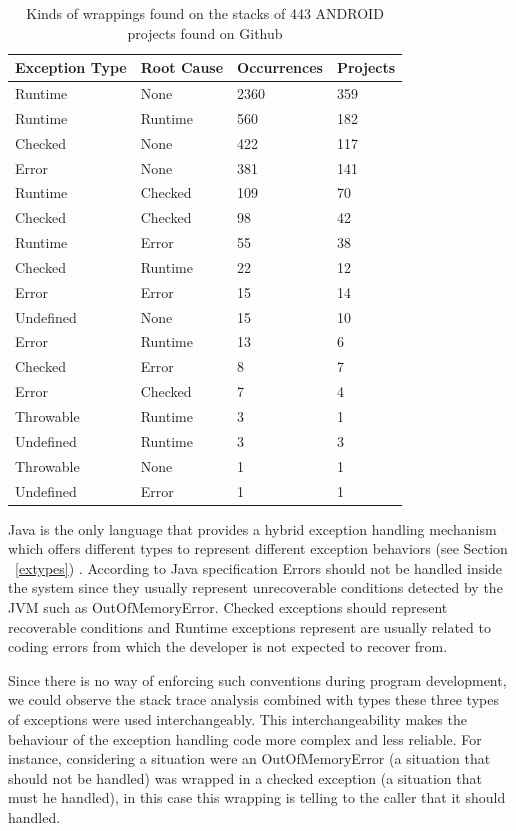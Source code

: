 \documentclass[conference]{IEEEtran}
\begin{document}
\begin{table}
\centering
\begin{tabular}{llll}
    \hline
    \bfseries{Exception Type} & \bfseries{Root Cause} & \bfseries{Occurrences} & \bfseries{Projects} \\
    \hline
    Runtime	&	None	&	2360	&	359	\\
Runtime	&	Runtime	&	560	&	182	\\
Checked	&	None	&	422	&	117	\\
Error	&	None	&	381	&	141	\\
Runtime	&	Checked	&	109	&	70	\\
Checked	&	Checked	&	98	&	42	\\
Runtime	&	Error	&	55	&	38	\\
Checked	&	Runtime	&	22	&	12	\\
Error	&	Error	&	15	&	14	\\
Undefined	&	None	&	15	&	10	\\
Error	&	Runtime	&	13	&	6	\\
Checked	&	Error	&	8	&	7	\\
Error	&	Checked	&	7	&	4	\\
Throwable	&	Runtime	&	3	&	1	\\
Undefined	&	Runtime	&	3	&	3	\\
Throwable	&	None	&	1	&	1	\\
Undefined	&	Error	&	1	&	1	\\
    \hline
  \end{tabular}
\caption{Kinds of wrappings found on the stacks of 443 ANDROID projects found on Github}
\label{fig:wrappingandroid}
\end{table}

Java is the only language that provides a hybrid exception handling mechanism which offers different types to represent different exception behaviors (see Section ~\ref{extypes}) . According to Java specification Errors should not be handled inside the system since they usually represent unrecoverable conditions detected by the JVM such as OutOfMemoryError. Checked exceptions should represent recoverable conditions and  Runtime exceptions represent are usually related to coding errors from which the developer is not expected to recover from. 


Since there is no way of enforcing such conventions during program development,  we could observe the stack trace analysis combined with types these three types of exceptions were used interchangeably. This interchangeability makes the behaviour of the exception handling code more complex and less reliable. For instance, considering a situation were an OutOfMemoryError (a situation that should not be handled) was wrapped in a checked exception (a situation that must he handled), in this case this wrapping is telling to the caller that it should handled.
\end{document}

